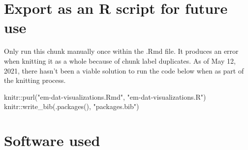 \documentclass[
  12pt,
]{article}
\newenvironment{Shaded}{}{}
\newcommand{\FunctionTok}[1]{\textcolor[rgb]{0.02,0.16,0.49}{#1}}
\newcommand{\NormalTok}[1]{#1}
\newcommand{\SpecialCharTok}[1]{\textcolor[rgb]{0.25,0.44,0.63}{#1}}
\newcommand{\StringTok}[1]{\textcolor[rgb]{0.25,0.44,0.63}{#1}}
\begin{document}
\hypertarget{export-as-an-r-script-for-future-use}{%
\section{Export as an R script for future
use}\label{export-as-an-r-script-for-future-use}}

Only run this chunk manually once within the .Rmd file. It produces an
error when knitting it as a whole because of chunk label duplicates. As
of May 12, 2021, there hasn't been a viable solution to run the code
below when as part of the knitting process.

\begin{Shaded}
\begin{Highlighting}[]
\NormalTok{knitr}\SpecialCharTok{::}\FunctionTok{purl}\NormalTok{(}\StringTok{"em{-}dat{-}visualizations.Rmd"}\NormalTok{, }
    \StringTok{"em{-}dat{-}visualizations.R"}\NormalTok{)}
\NormalTok{knitr}\SpecialCharTok{::}\FunctionTok{write\_bib}\NormalTok{(}\FunctionTok{.packages}\NormalTok{(), }\StringTok{"packages.bib"}\NormalTok{)}
\end{Highlighting}
\end{Shaded}

\hypertarget{software-used}{%
\section*{Software used}\label{software-used}}
\end{document}
